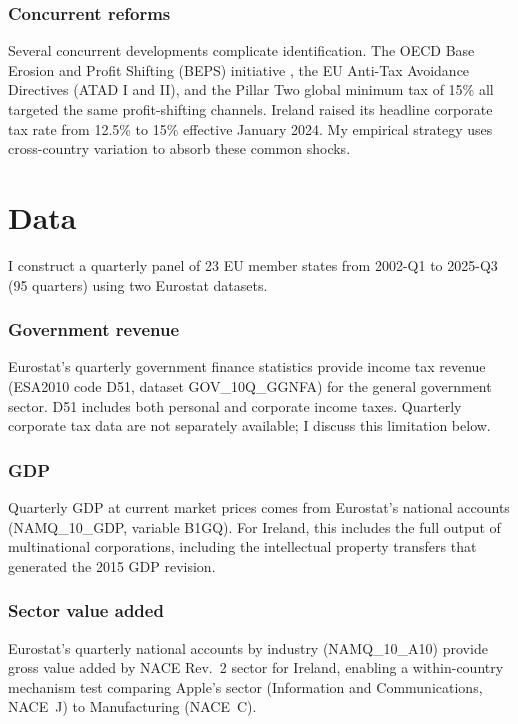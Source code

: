 \documentclass[12pt]{article}
\begin{document}
\subsubsection*{Concurrent reforms} Several concurrent developments complicate identification. The OECD Base Erosion and Profit Shifting (BEPS) initiative \citep{oecd2015beps}, the EU Anti-Tax Avoidance Directives (ATAD I and II), and the Pillar Two global minimum tax of 15\% \citep{oecd2021pillar} all targeted the same profit-shifting channels. Ireland raised its headline corporate tax rate from 12.5\% to 15\% effective January 2024. My empirical strategy uses cross-country variation to absorb these common shocks.

\section{Data}

I construct a quarterly panel of 23 EU member states from 2002-Q1 to 2025-Q3 (95 quarters) using two Eurostat datasets.

\subsubsection*{Government revenue} Eurostat's quarterly government finance statistics provide income tax revenue (ESA2010 code D51, dataset GOV\_10Q\_GGNFA) for the general government sector. D51 includes both personal and corporate income taxes. Quarterly corporate tax data are not separately available; I discuss this limitation below.

\subsubsection*{GDP} Quarterly GDP at current market prices comes from Eurostat's national accounts (NAMQ\_10\_GDP, variable B1GQ). For Ireland, this includes the full output of multinational corporations, including the intellectual property transfers that generated the 2015 GDP revision.

\subsubsection*{Sector value added} Eurostat's quarterly national accounts by industry (NAMQ\_10\_A10) provide gross value added by NACE Rev.~2 sector for Ireland, enabling a within-country mechanism test comparing Apple's sector (Information and Communications, NACE~J) to Manufacturing (NACE~C).
\end{document}
